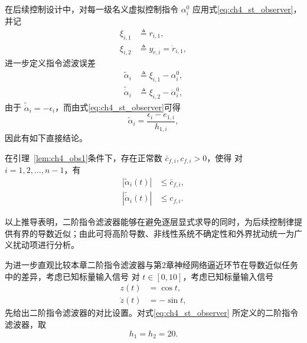 在后续控制设计中，对每一级名义虚拟控制指令 $\alpha_i^0$ 应用式\eqref{eq:ch4_st_observer}，并记
\begin{subequations}
\begin{align}
\xi_{i,1}&\triangleq r_{i,1},\\
\xi_{i,2}&\triangleq y_{r,i}=\dot r_{i,1},
\end{align}
\end{subequations}
进一步定义指令滤波误差
\begin{subequations}\label{eq:ch4_ws_def}
\begin{align}
\tilde\alpha_i&\triangleq \xi_{i,1}-\alpha_i^0,\\
\tilde{\dot\alpha}_i&\triangleq \xi_{i,2}-\dot\alpha_i^0,
\end{align}
\end{subequations}
由于 $\tilde{\dot\alpha}_i=-\epsilon_i$，而由式\eqref{eq:ch4_st_observer}可得
\begin{equation}
\tilde\alpha_i=\frac{\epsilon_i-e_{1,i}}{h_{1,i}},
\end{equation}
因此有如下直接结论。
\begin{lemma}\label{lem:ch4_obs2}\hfill\cite{ref6}
在引理~\ref{lem:ch4_obs1}条件下，存在正常数 $\bar c_{f,i},c_{f,i}>0$，使得
对 $i=1,2,\ldots,n-1$，有
\begin{subequations}
\begin{align}
|\tilde\alpha_i(t)|&\le \bar c_{f,i},\\
|\tilde{\dot\alpha}_i(t)|&\le c_{f,i}.
\end{align}
\end{subequations}
\end{lemma}

以上推导表明，二阶指令滤波器能够在避免逐层显式求导的同时，为后续控制律提供有界的导数近似；由此可将高阶导数、非线性系统不确定性和外界扰动统一为广义扰动项进行分析。

为进一步直观比较本章二阶指令滤波器与第2章神经网络逼近环节在导数近似任务中的差异，考虑已知标量输入信号
对 $t\in[0,10]$，考虑已知标量输入信号
\begin{subequations}\label{eq:ch3_filter_compare_signal}
\begin{align}
z(t)&=\cos t,\\
\dot z(t)&=-\sin t,
\end{align}
\end{subequations}
先给出二阶指令滤波器的对比设置。对式\eqref{eq:ch4_st_observer} 所定义的二阶指令滤波器，取
\begin{equation}
  h_1=h_2=20.
\end{equation}

